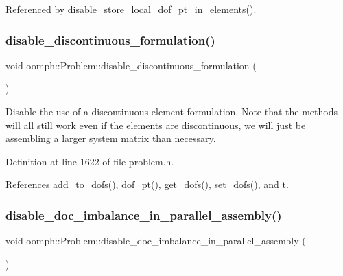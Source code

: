 Referenced by disable\+\_\+store\+\_\+local\+\_\+dof\+\_\+pt\+\_\+in\+\_\+elements().

\mbox{\label{classoomph_1_1Problem_afa64d728ceff0dd772bbbc8f2adcddfb}} 
\subsubsection{\texorpdfstring{disable\+\_\+discontinuous\+\_\+formulation()}{disable\_discontinuous\_formulation()}}
{\footnotesize\ttfamily void oomph\+::\+Problem\+::disable\+\_\+discontinuous\+\_\+formulation (\begin{DoxyParamCaption}{ }\end{DoxyParamCaption})\hspace{0.3cm}{\ttfamily [inline]}}



Disable the use of a discontinuous-\/element formulation. Note that the methods will all still work even if the elements are discontinuous, we will just be assembling a larger system matrix than necessary. 



Definition at line 1622 of file problem.\+h.



References add\+\_\+to\+\_\+dofs(), dof\+\_\+pt(), get\+\_\+dofs(), set\+\_\+dofs(), and t.

\mbox{\label{classoomph_1_1Problem_a9365d2b0057089ae5551b97488a3a62a}} 
\subsubsection{\texorpdfstring{disable\+\_\+doc\+\_\+imbalance\+\_\+in\+\_\+parallel\+\_\+assembly()}{disable\_doc\_imbalance\_in\_parallel\_assembly()}}
{\footnotesize\ttfamily void oomph\+::\+Problem\+::disable\+\_\+doc\+\_\+imbalance\+\_\+in\+\_\+parallel\+\_\+assembly (\begin{DoxyParamCaption}{ }\end{DoxyParamCaption})\hspace{0.3cm}{\ttfamily [inline]}}



